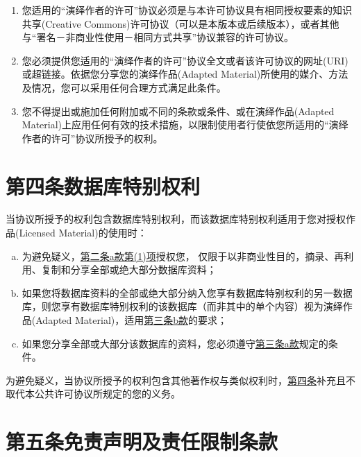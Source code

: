 \begin{enumerate}[a.]
    \begin{enumerate}[1.]
        \item 您适用的“演绎作者的许可”协议必须是与本许可协议具有相同授权要素的知识共享(Creative Commons)许可协议（可以是本版本或后续版本），或者其他与“署名－非商业性使用－相同方式共享”协议兼容的许可协议。\label{entry:A.3.b.1}
        \item 您必须提供您适用的“演绎作者的许可”协议全文或者该许可协议的网址(URI)或超链接。依据您分享您的演绎作品(Adapted Material)所使用的媒介、方法及情况，您可以采用任何合理方式满足此条件。\label{entry:A.3.b.2}
        \item 您不得提出或施加任何附加或不同的条款或条件、或在演绎作品(Adapted Material)上应用任何有效的技术措施，以限制使用者行使依您所适用的“演绎作者的许可”协议所授予的权利。\label{entry:A.3.b.3}
    \end{enumerate}
\end{enumerate}

\section*{第四条\;数据库特别权利}\label{section:A.4}

当协议所授予的权利包含数据库特别权利，而该数据库特别权利适用于您对授权作品(Licensed Material)的使用时：

\begin{enumerate}[a.]
    \item 为避免疑义，\hyperref[entry:A.2.a.1]{第二条a款第(1)项}授权您， 仅限于以非商业性目的，摘录、再利用、复制和分享全部或绝大部分数据库资料；\label{entry:A.4.a}
    \item 如果您将数据库资料的全部或绝大部分纳入您享有数据库特别权利的另一数据库，则您享有数据库特别权利的该数据库（而非其中的单个内容）视为演绎作品(Adapted Material)，适用\hyperref[entry:A.3.b]{第三条b款}的要求；\label{entry:A.4.b}
    \item 如果您分享全部或大部分该数据库的资料，您必须遵守\hyperref[entry:A.3.a]{第三条a款}规定的条件。\label{entry:A.4.c}
\end{enumerate}

为避免疑义，当协议所授予的权利包含其他著作权与类似权利时，\hyperref[section:A.4]{第四条}补充且不取代本公共许可协议所规定的您的义务。

\section*{第五条\;免责声明及责任限制条款} \label{section:A.5}

